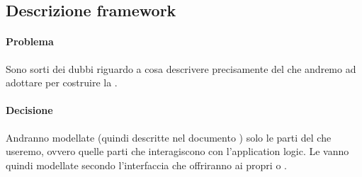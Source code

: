\subsection{Descrizione framework}
\paragraph{Problema} Sono sorti dei dubbi riguardo a cosa descrivere precisamente del  che andremo ad adottare per costruire la .
\paragraph{Decisione} Andranno modellate (quindi descritte nel documento \ST) solo le parti del  che useremo, ovvero quelle parti che interagiscono con l’application logic.
Le  vanno quindi modellate secondo l’interfaccia che offriranno ai propri  o .
